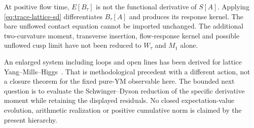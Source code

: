 At positive flow time, $E[B_\tau]$ is not the functional derivative
of $S[A]$. Applying \eqref{eq:trace-lattice-sd} differentiates
$B_\tau[A]$ and produces its response kernel. The bare unflowed
contact equation cannot be imported unchanged. The additional
two-curvature moment, transverse insertion, flow-response kernel
and possible unflowed cusp limit have not been reduced to $W_\tau$
and $M_1$ alone.

An enlarged system including loops and open lines has been derived
for lattice Yang--Mills--Higgs~\cite{ShenSmithZhuLines}. That is
methodological precedent with a different action, not a closure
theorem for the fixed pure-YM observable here. The bounded next
question is to evaluate the Schwinger--Dyson reduction of the
specific derivative moment while retaining the displayed residuals.
No closed expectation-value evolution, arithmetic realization or
positive cumulative norm is claimed by the present hierarchy.
